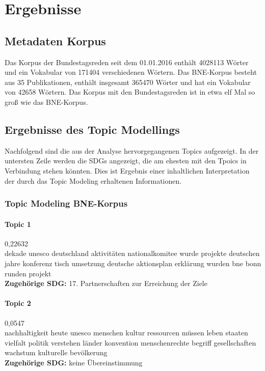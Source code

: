 \documentclass[a4paper,11pt]{article}
\begin{document}
\section{Ergebnisse}
\subsection{Metadaten Korpus}
Das Korpus der Bundestagsreden seit dem 01.01.2016 enthält 4028113 Wörter und
ein Vokabular von 171404 verschiedenen Wörtern. Das BNE-Korpus besteht aus 35
Publikationen, enthält insgesamt 365470 Wörter und hat ein Vokabular von 42658
Wörtern. Das Korpus mit den Bundestagsreden ist in etwa elf Mal so groß wie
das BNE-Korpus.

\subsection{Ergebnisse des Topic Modellings} 
Nachfolgend sind die aus der Analyse hervorgegangenen Topics aufgezeigt. In
der untersten Zeile werden die SDGs angezeigt, die am ehesten mit den Tpoics
in Verbindung stehen könnten. Dies ist Ergebnis einer inhaltlichen
Interpretation der durch das Topic Modeling erhaltenen Informationen.

\subsubsection{Topic Modeling BNE-Korpus}

\paragraph{Topic 1} 0,22632\\
dekade unesco deutschland aktivitäten nationalkomitee wurde projekte deutschen
jahre konferenz tisch umsetzung deutsche aktionsplan erklärung wurden bne bonn
runden projekt  \\ 
\textbf{Zugehörige SDG:} 17. Partnerschaften zur Erreichung der Ziele

\paragraph{Topic 2} 0,0547\\
nachhaltigkeit heute unesco menschen kultur ressourcen müssen leben staaten
vielfalt politik verstehen länder konvention menschenrechte begriff
gesellschaften wachstum kulturelle bevölkerung   \\ 
\textbf{Zugehörige SDG:} keine Übereinstimmung 
\end{document}
